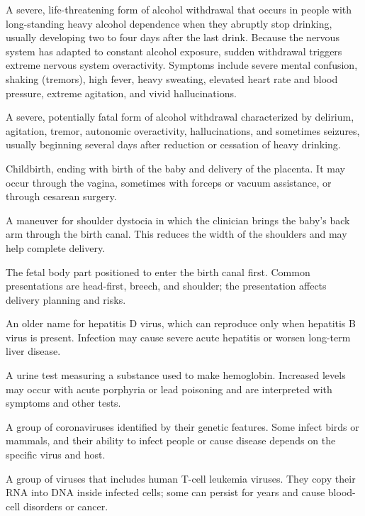  A severe, life-threatening form of alcohol withdrawal that occurs in people with long-standing heavy alcohol dependence when they abruptly stop drinking, usually developing two to four days after the last drink. Because the nervous system has adapted to constant alcohol exposure, sudden withdrawal triggers extreme nervous system overactivity. Symptoms include severe mental confusion, shaking (tremors), high fever, heavy sweating, elevated heart rate and blood pressure, extreme agitation, and vivid hallucinations.

 A severe, potentially fatal form of alcohol withdrawal characterized by delirium, agitation, tremor, autonomic overactivity, hallucinations, and sometimes seizures, usually beginning several days after reduction or cessation of heavy drinking.

 Childbirth, ending with birth of the baby and delivery of the placenta. It may occur through the vagina, sometimes with forceps or vacuum assistance, or through cesarean surgery.

 A maneuver for shoulder dystocia in which the clinician brings the baby’s back arm through the birth canal. This reduces the width of the shoulders and may help complete delivery.

 The fetal body part positioned to enter the birth canal first. Common presentations are head-first, breech, and shoulder; the presentation affects delivery planning and risks.

 An older name for hepatitis D virus, which can reproduce only when hepatitis B virus is present. Infection may cause severe acute hepatitis or worsen long-term liver disease.

 A urine test measuring a substance used to make hemoglobin. Increased levels may occur with acute porphyria or lead poisoning and are interpreted with symptoms and other tests.

 A group of coronaviruses identified by their genetic features. Some infect birds or mammals, and their ability to infect people or cause disease depends on the specific virus and host.

 A group of viruses that includes human T-cell leukemia viruses. They copy their RNA into DNA inside infected cells; some can persist for years and cause blood-cell disorders or cancer.

